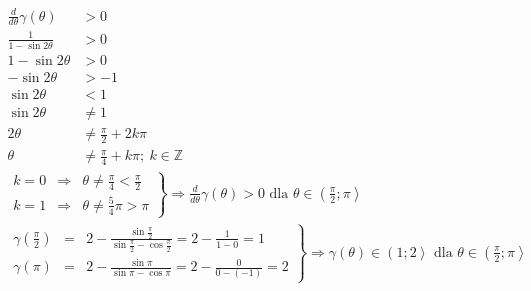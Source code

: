         \begin{align*}
        	\frac{d}{d\theta}\gamma\left( \theta\right)& > 0& \hspace{10cm}\\
        	\frac{
        		1
        	}{
        		1 - \sin 2\theta
        	} & > 0\\
        	1 - \sin 2\theta & > 0\\
        	 -\sin 2\theta & > -1\\
        	 \sin 2\theta & < 1\\
        	 \sin 2\theta & \neq 1\\
        	 2\theta & \neq \frac{\pi}{2} + 2k\pi\\
        	 \theta & \neq \frac{\pi}{4} + k\pi ; \ k \in \mathbb{Z}
        \end{align*}\alignspace
       	\begin{align*}
       		\left. \begin{array}{rcl}
       		 k = 0 & \Rightarrow & \theta \neq \frac{\pi}{4} < \frac{\pi}{2}  \\
    	 	 k = 1 & \Rightarrow &\theta \neq \frac{5}{4}\pi > \pi
    	 	\end{array}    \right\}\Rightarrow \frac{d}{d\theta}\gamma\left( \theta\right) > 0 \text{ dla } \theta \in \left( \frac{\pi}{2};\pi\right\rangle& \hspace{10cm}
        \end{align*}\alignspace
       	\begin{align*}
       	\left. \begin{array}{rcl}
       		\gamma\left( \frac{\pi}{2}\right) & = &
       		 2 - \frac{\sin \frac{\pi}{2}}{\sin \frac{\pi}{2} - \cos \frac{\pi}{2}} 
       		 =2 - \frac{1}{1 - 0} = 1\\	
       		\gamma\left( \pi\right) & = &
       		2 - \frac{\sin  \pi}{\sin  \pi - \cos \pi} = 2 - \frac{0}{0 - \left(-1\right)}= 2
       	\end{array} \right\} \Rightarrow \gamma\left( \theta\right) \in \left( 1;2\right\rangle \text{ dla } \theta \in \left( \frac{\pi}{2};\pi\right\rangle& \hspace{10cm}
        \end{align*}